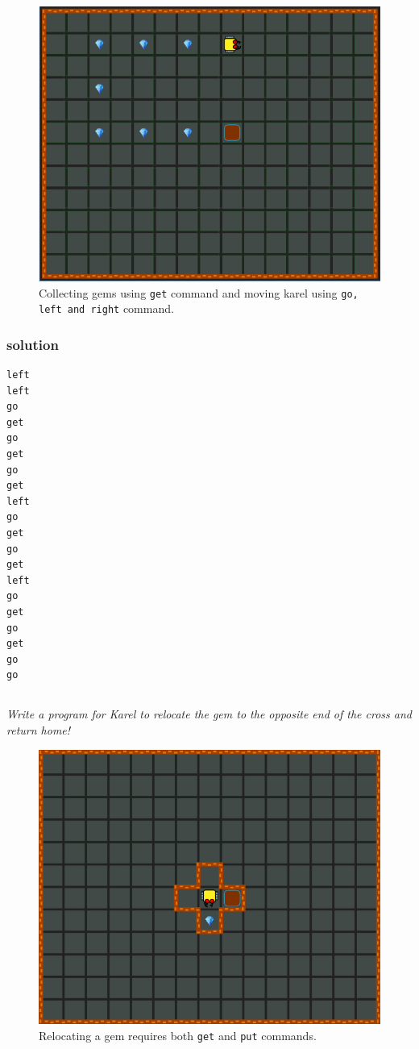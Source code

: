 \documentclass[article,A4,12pt]{llncs}
\begin{document}
{{\vspace{-5mm}
\begin{figure}[!ht]
\begin{center}
\includegraphics[height=0.4\textwidth]{imgk/a19.png}
\end{center}
\vspace{-4mm}
\caption{Collecting gems using {\tt get} command and moving karel using {\tt go, left and right} command.}
\label{fig:b06}
\vspace{-4mm}
\end{figure}
\noindent

\subsubsection{solution}

\begin{verbatim}
left
left
go
get
go
get
go
get
left
go
get
go
get
left
go 
get
go
get
go
go
\end{verbatim}

\subsection{}

{\em Write a program for Karel to relocate the gem to the opposite 
end of the cross and return home!}



\begin{figure}[!ht]
\begin{center}
\includegraphics[height=0.4\textwidth]{imgk/b04.png}
\end{center}
\vspace{-4mm}
\caption{Relocating a gem requires both {\tt get} and {\tt put} commands.}
\label{fig:b04}
\vspace{-4mm}
\end{figure}
\noindent


}}
\end{document}
